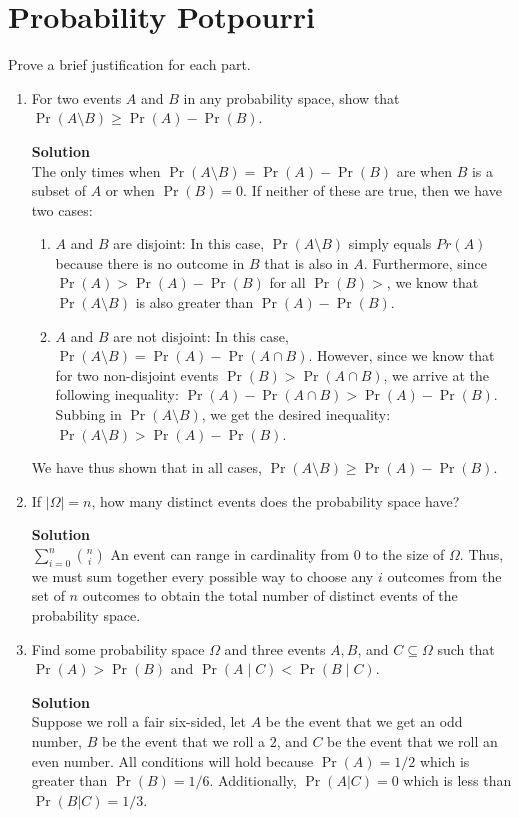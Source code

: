\documentclass[11pt]{article}
\newcommand*{\Question}[1]{\section{#1}}
\newenvironment{Parts}{\begin{enumerate}[label=(\alph*)]}{\end{enumerate}}
\newcommand*{\Part}{\item}
\newenvironment{Answer}{\vspace{10pt}\begin{mdframed}\textbf{Solution}\\}{\end{mdframed}\vfill\pagebreak[3]}
\newenvironment{Answer}{\vspace{10pt}}{\vfill\pagebreak[3]}
\begin{document}
\Question{Probability Potpourri}

Prove a brief justification for each part.

\begin{Parts}

\Part For two events $A$ and $B$ in any probability space, show that $\Pr(A \setminus B) \geq \Pr(A) - \Pr(B)$.
\begin{Answer}
    The only times when $\Pr(A \setminus B)=\Pr(A) - \Pr(B)$ are when $B$ is a subset of $A$ or when $\Pr(B)=0$. If neither of these are true, then we have two cases:
    \begin{enumerate}
        \item $A$ and $B$ are disjoint: In this case, $\Pr(A \setminus B)$ simply equals $Pr(A)$ because there is no outcome in $B$ that is also in $A$. Furthermore, since $\Pr(A) > \Pr(A)-\Pr(B)$ for all $\Pr(B)>$, we know that $\Pr(A \setminus B)$ is also greater than $\Pr(A)-\Pr(B)$.
        
        \item $A$ and $B$ are not disjoint: In this case, $\Pr(A \setminus B)=\Pr(A)-\Pr(A \cap B)$. However, since we know that for two non-disjoint events $\Pr(B)>\Pr(A \cap B)$, we arrive at the following inequality: $\Pr(A)-\Pr(A \cap B)>\Pr(A)-\Pr(B)$. Subbing in $\Pr(A \setminus B)$, we get the desired inequality: $\Pr(A \setminus B)>\Pr(A)-\Pr(B)$.
        
    \end{enumerate}
    We have thus shown that in all cases, $\Pr(A \setminus B) \geq \Pr(A) - \Pr(B)$.
\end{Answer}

\Part If $|\Omega| = n$, how many distinct events does the probability space have?
\begin{Answer}
$\sum_{i=0}^{n} \binom{n}{i}$ An event can range in cardinality from 0 to the size of $\Omega$. Thus, we must sum together every possible way to choose any $i$ outcomes from the set of $n$ outcomes to obtain the total number of distinct events of the probability space. 
\end{Answer}

\Part Find some probability space $\Omega$ and three events $A, B$, and $C \subseteq \Omega$ such that $\Pr(A) > \Pr(B)$ and $\Pr(A \mid C) < \Pr(B \mid C)$.
\begin{Answer}
    Suppose we roll a fair six-sided, let $A$ be the event that we get an odd number, $B$ be the event that we roll a $2$, and $C$ be the event that we roll an even number. All conditions will hold because $\Pr(A)=1/2$ which is greater than $\Pr(B)=1/6$. Additionally, $\Pr(A|C)=0$ which is less than $\Pr(B|C)=1/3$.
\end{Answer}


\end{Parts}
\end{document}
